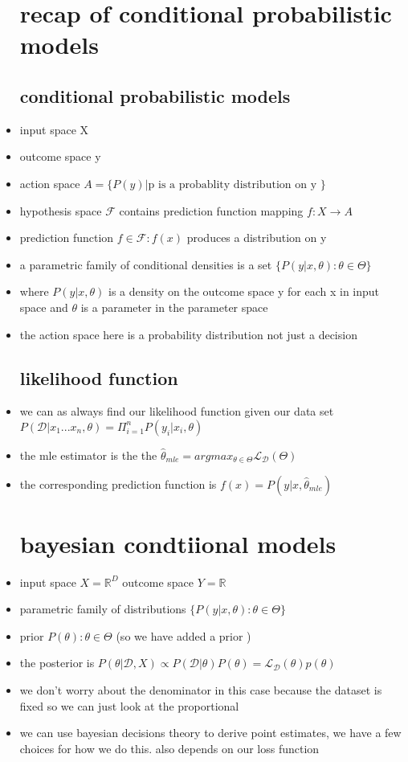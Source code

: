 \documentclass{article}
\begin{document}
\begin{itemize}
\section*{recap of conditional probabilistic models}
\subsection*{conditional probabilistic models}
\item input space X
\item outcome space y 
\item action space $A=\{P(y)|\text{p is a probablity distribution on y }\}$
\item hypothesis space $\mathcal{F}$ contains prediction function mapping $f:X\rightarrow A$
\item prediction function $f\in \mathcal{F}:f(x)$ produces a distribution on y
\item a parametric family of conditional densities is a set $\{P(y|x,\theta):\theta\in \Theta\}$
\item where $P(y|x,\theta)$ is a density on the outcome space y for each x in input space and $\theta$ is a parameter in the parameter space 
\item the action space here is a probability distribution not just a decision
\subsection*{likelihood function}
\item we can as always find our likelihood function given our data set $P(\mathcal{D}|x_1...x_n, \theta)=\Pi_{i=1}^{n}P(y_i|x_i,\theta)$
\item the mle estimator is the the $\hat{\theta}_{mle}=argmax_{\theta\in \Theta}\mathcal{L}_{\mathcal{D}}(\Theta)$
\item the corresponding prediction function is $f(x)=P(y|x,\hat{\theta}_{mle})$
\section*{bayesian condtiional models }
\item input space $X= \mathbb{R}^{D}$ outcome space $Y=\mathbb{R}$
\item parametric family of distributions $\{P(y|x,\theta):\theta\in \Theta\}$
\item prior $P(\theta):\theta\in \Theta$ (so we have added a prior )
\item the posterior is $P(\theta|\mathcal{D}, X)\propto P(\mathcal{D}|\theta)P(\theta)=\mathcal{L}_{\mathcal{D}}(\theta)p(\theta)$
\item we don't worry about the denominator in this case because the dataset is fixed so we can just look at the proportional 
\item we can use bayesian decisions theory to derive point estimates, we have a few choices for how we do this. also depends on our loss function 

\end{itemize}
\end{document}
